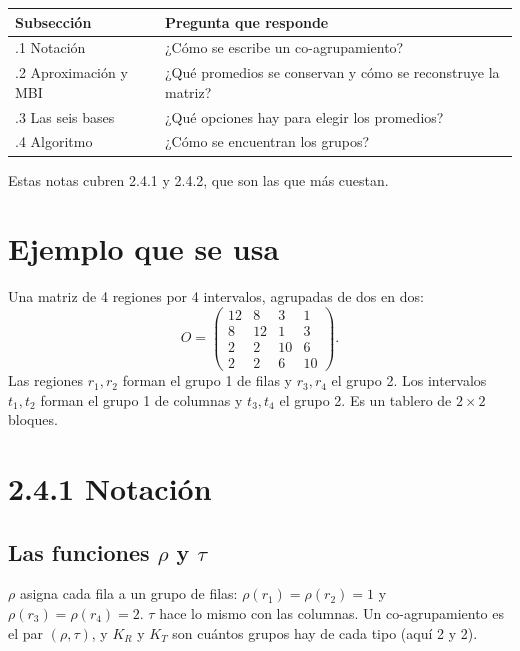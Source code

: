 \documentclass[11pt,a4paper]{article}
\begin{document}
\begin{center}
\renewcommand{\arraystretch}{1.3}
\begin{tabular}{@{}>{\raggedright\arraybackslash}p{4.2cm}>{\raggedright\arraybackslash}p{9.6cm}@{}}
\toprule
\textbf{Subsección} & \textbf{Pregunta que responde} \\
\midrule
2.4.1 Notación & ¿Cómo se escribe un co-agrupamiento? \\
\midrule
2.4.2 Aproximación y MBI & ¿Qué promedios se conservan y cómo se reconstruye la matriz? \\
\midrule
2.4.3 Las seis bases & ¿Qué opciones hay para elegir los promedios? \\
\midrule
2.4.4 Algoritmo & ¿Cómo se encuentran los grupos? \\
\bottomrule
\end{tabular}
\end{center}
Estas notas cubren 2.4.1 y 2.4.2, que son las que más cuestan.

\section{Ejemplo que se usa}

Una matriz de 4 regiones por 4 intervalos, agrupadas de dos en dos:
\[
  O=\begin{pmatrix}
    12 & 8 & 3 & 1\\
    8 & 12 & 1 & 3\\
    2 & 2 & 10 & 6\\
    2 & 2 & 6 & 10
  \end{pmatrix}.
\]
Las regiones $r_1,r_2$ forman el grupo 1 de filas y $r_3,r_4$ el grupo 2. Los
intervalos $t_1,t_2$ forman el grupo 1 de columnas y $t_3,t_4$ el grupo 2. Es un
tablero de $2\times2$ bloques.

\section{2.4.1 Notación}

\subsection{Las funciones $\rho$ y $\tau$}

$\rho$ asigna cada fila a un grupo de filas: $\rho(r_1)=\rho(r_2)=1$ y
$\rho(r_3)=\rho(r_4)=2$. $\tau$ hace lo mismo con las columnas. Un co-agrupamiento
es el par $(\rho,\tau)$, y $K_R$ y $K_T$ son cuántos grupos hay de cada tipo (aquí
2 y 2).
\end{document}
